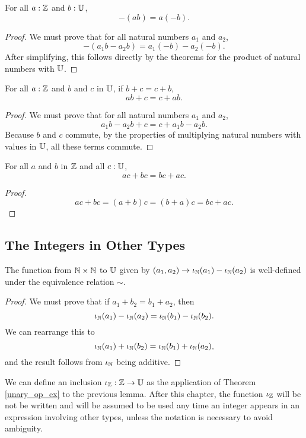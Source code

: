 \documentclass[../../math.tex]{subfiles}
\begin{document}
\begin{theorem}
    For all $a : \mathbb{Z}$ and $b : \mathbb{U}$,
    \[
        -(ab) = a(-b).
    \]
\end{theorem}
\begin{proof}
    We must prove that for all natural numbers $a_1$ and $a_2$,
    \[
        -(a_1b - a_2b) = a_1(-b) - a_2(-b).
    \]
    After simplifying, this follows directly by the theorems for the product of
    natural numbers with $\mathbb{U}$.
\end{proof}

\begin{theorem}
    For all $a : \mathbb{Z}$ and $b$ and $c$ in $\mathbb{U}$, if $b + c = c + b$,
    \[
        ab + c = c + ab.
    \]
\end{theorem}
\begin{proof}
    We must prove that for all natural numbers $a_1$ and $a_2$,
    \[
        a_1b - a_2b + c = c + a_1b - a_2b.
    \]
    Because $b$ and $c$ commute, by the properties of multiplying natural
    numbers with values in $\mathbb{U}$, all these terms commute.
\end{proof}

\begin{theorem}
    For all $a$ and $b$ in $\mathbb{Z}$ and all $c : \mathbb{U}$,
    \[
        ac + bc = bc + ac.
    \]
\end{theorem}
\begin{proof}
    \[
        ac + bc = (a + b)c = (b + a)c = bc + ac.
    \]
\end{proof}

\subsection{The Integers in Other Types}

\begin{lemma}
    The function from $\mathbb{N} \times \mathbb{N}$ to $\mathbb{U}$ given by $(a_1, a_2) \to
    \iota_{\mathbb{N}}(a_1) - \iota_{\mathbb{N}}(a_2)$ is well-defined under the equivalence relation $\sim$.
\end{lemma}
\begin{proof}
    We must prove that if $a_1 + b_2 = b_1 + a_2$, then
    \[
        \iota_{\mathbb{N}}(a_1) - \iota_{\mathbb{N}}(a_2) = \iota_{\mathbb{N}}(b_1) - \iota_{\mathbb{N}}(b_2).
    \]
    We can rearrange this to
    \[
        \iota_{\mathbb{N}}(a_1) + \iota_{\mathbb{N}}(b_2) = \iota_{\mathbb{N}}(b_1) + \iota_{\mathbb{N}}(a_2),
    \]
    and the result follows from $\iota_{\mathbb{N}}$ being additive.
\end{proof}

\begin{definition}
    We can define an inclusion $\iota_{\mathbb{Z}} : \mathbb{Z} \rightarrow \mathbb{U}$ as the application of
    Theorem \ref{unary_op_ex} to the previous lemma.  After this chapter, the
    function $\iota_{\mathbb{Z}}$ will be not be written and will be assumed to be used any
    time an integer appears in an expression involving other types, unless the
    notation is necessary to avoid ambiguity.
\end{definition}
\end{document}
